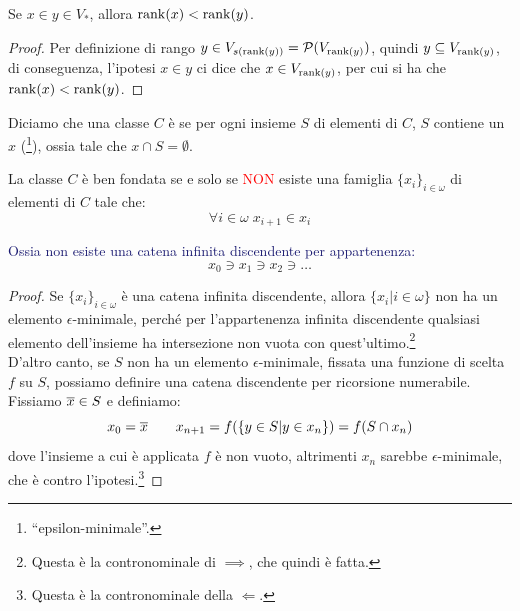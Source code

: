 \begin{lemma}
	Se $x \in y \in V_*$, allora $\operatorname{rank}(x) < \operatorname{rank}(y)$.
\end{lemma}

\begin{proof}
	Per definizione di rango $y \in V_{s(\operatorname{rank}(y))} = \mathcal{P}(V_{\operatorname{rank}(y)})$, quindi $y \subseteq V_{\operatorname{rank}(y)}$, di conseguenza, l'ipotesi $x \in y$ ci dice che $x \in V_{\operatorname{rank}(y)}$, per cui si ha che $\operatorname{rank}(x) < \operatorname{rank}(y)$.
\end{proof}

\begin{definition}
	Diciamo che una classe $C$ \`e  se per ogni insieme $S$ di elementi di $C$, $S$ contiene un $x$  (\footnote{\;``epsilon-minimale''.}),
	ossia tale che $x \cap S = \emptyset$.
\end{definition}

\begin{proposition}
	La classe $C$ \`e ben fondata se e solo se \textcolor{red}{NON} esiste una famiglia $\{x_i\}_{i \in \omega}$ di elementi di $C$ tale che:
	\[ \forall i \in \omega \; x_{i+1}\in x_i
		\]
\end{proposition}

\textcolor{MidnightBlue}{Ossia non esiste una catena infinita discendente per appartenenza:}
\[ x_0 \ni x_1 \ni x_2 \ni \ldots
	\]

\begin{proof}
	Se $\{x_i\}_{i \in \omega}$ \`e una catena infinita discendente, allora $\{x_i | i \in \omega\}$ non ha un elemento $\epsilon$-minimale, perch\'e per l'appartenenza infinita discendente qualsiasi elemento dell'insieme ha intersezione non vuota con quest'ultimo.\footnote{Questa \`e la contronominale di $\implies$, che quindi \`e fatta.}\\
	D'altro canto, se $S$ non ha un elemento $\epsilon$-minimale, fissata una funzione di scelta $f$ su $S$, possiamo definire una catena discendente per ricorsione numerabile. Fissiamo $\overline x \in S$ e definiamo:
	\[ x_0 = \overline x \qquad x_{n+1} = f(\{y \in S | y \in x_n\}) = f(S \cap x_n)
		\]
	dove l'insieme a cui \`e applicata $f$ \`e non vuoto, altrimenti $x_n$ sarebbe $\epsilon$-minimale, che \`e contro l'ipotesi.\footnote{Questa \`e la contronominale della $\Longleftarrow$.}
\end{proof}

